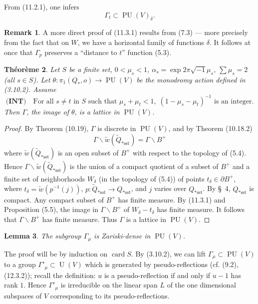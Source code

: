 \documentclass[12pt,a4paper]{article}
\theoremstyle{plain}
\newtheorem{theorem}{Th\'eor\`eme}[section]
\newtheorem{lemma}[theorem]{Lemma}
\theoremstyle{definition}
\newtheorem{remark}[theorem]{Remark}
\theoremstyle{remark}
\DeclareMathOperator{\card}{card}
\DeclareMathOperator{\PU}{PU}
\DeclareMathOperator{\U}{U}
\begin{document}
From (11.2.1), one infers
\begin{equation}
\label{11.3.1}
\Gamma_t \subset \PU(V)_\delta.
\end{equation}

\begin{remark}
A more direct proof of (11.3.1) results from (7.3) --- more precisely from the fact that on $W$, we have a horizontal family of functions $\delta$. It follows at once that $\Gamma_p$ preserves a ``distance to $t$'' function (5.3).
\end{remark}

\begin{theorem}
\label{11.4}
Let $S$ be a finite set, $0 < \mu_s < 1$, $\alpha_s = \exp 2\pi\sqrt{-1}\mu_s$, $\sum \mu_s = 2$ (all $s \in S$). Let $\theta : \pi_1(Q_*, o) \to \PU(V)$ be the monodromy action defined in (3.10.2). Assume
\[
\textbf{(INT)} \quad \text{For all } s \neq t \text{ in } S \text{ such that } \mu_s + \mu_t < 1, \; (1 - \mu_s - \mu_t)^{-1} \text{ is an integer}.
\]
Then $\Gamma$, the image of $\theta$, is a lattice in $\PU(V)$.
\end{theorem}

\begin{proof}
By Theorem (10.19), $\Gamma$ is discrete in $\PU(V)$, and by Theorem (10.18.2)
\[
\Gamma \backslash \widetilde{w}(\widetilde{Q}_{*\text{sst}}) = \Gamma \backslash B^+
\]
where $\widetilde{w}(\widetilde{Q}_{*\text{sst}})$ is an open subset of $B^+$ with respect to the topology of (5.4). Hence $\Gamma \backslash \widetilde{w}(\widetilde{Q}_{*\text{sst}})$ is the union of a compact quotient of a subset of $B^+$ and a finite set of neighborhoods $W_\delta$ (in the topology of (5.4)) of points $t_\delta \in \partial B^+$, where $t_\delta = \widetilde{w}(p^{-1}(j))$, $p : \widetilde{Q}_{*\text{sst}} \to Q_{*\text{sst}}$, and $j$ varies over $Q_{*\text{sst}}$. By \S\ 4, $Q_{*\text{sst}}$ is compact. Any compact subset of $B^+$ has finite measure. By (11.3.1) and Proposition (5.5), the image in $\Gamma \backslash B^+$ of $W_\delta - t_\delta$ has finite measure. It follows that $\Gamma \backslash B^+$ has finite measure. Thus $\Gamma$ is a lattice in $\PU(V)$.
\end{proof}

\begin{lemma}
\label{11.5}
The subgroup $\Gamma_\mu$ is Zariski-dense in $\PU(V)$.
\end{lemma}

The proof will be by induction on $\card S$. By (3.10.2), we can lift $\Gamma_\mu \subset \PU(V)$ to a group $\Gamma'_\mu \subset \U(V)$ which is generated by pseudo-reflections (cf. (9.2), (12.3.2)); recall the definition: $u$ is a pseudo-reflection if and only if $u - 1$ has rank $1$. Hence $\Gamma'_\mu$ is irreducible on the linear span $L$ of the one dimensional subspaces of $V$ corresponding to its pseudo-reflections.
\end{document}
